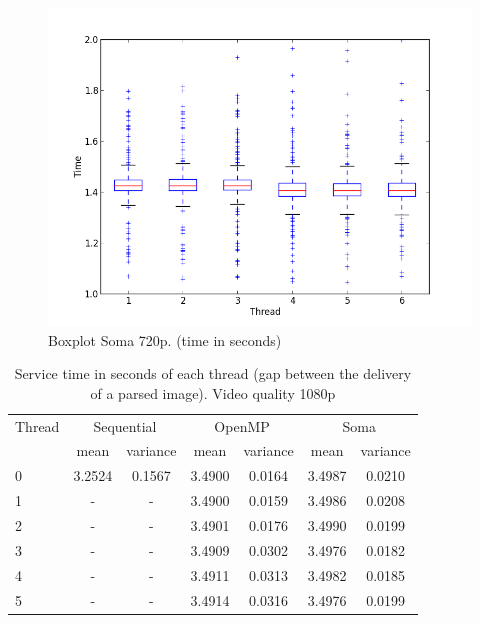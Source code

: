 \documentclass[a4paper,12pt,oneside]{book}
\begin{document}
\begin{figure}[H]
\centering
\includegraphics[scale=0.55]{soma_time_720txtbox.png}
\caption{Boxplot Soma 720p. (time in seconds)}
\label{box720soma}
\end{figure}

\begin{table}[H]
\begin{center}
\begin{tabular}{| l || c | c || c | c || c | c |} 
\hline
  Thread & \multicolumn{2}{|c||}{Sequential} & \multicolumn{2}{|c||}{OpenMP} & \multicolumn{2}{|c|}{Soma} \\
\cline{2-7}
& mean & variance & mean & variance & mean & variance \\
\cline{2-7}
\hline
0 & 3.2524 & 0.1567 & 3.4900 & 0.0164 & 3.4987 & 0.0210  \\
\hline
1 & - & - & 3.4900 & 0.0159 & 3.4986 & 0.0208 \\
\hline
2 & - & - & 3.4901 & 0.0176 & 3.4990 & 0.0199 \\
\hline 
3 & - & - & 3.4909 & 0.0302 & 3.4976 & 0.0182 \\
\hline
4 & - & - & 3.4911 & 0.0313 & 3.4982 & 0.0185 \\
\hline
5 & - & - & 3.4914 & 0.0316 & 3.4976 & 0.0199  \\
\hline
\end{tabular}
\caption{Service time in seconds of each thread (gap between the delivery of a parsed image). Video quality 1080p}
\label{times3}
\end{center}
\end{table}
\end{document}
